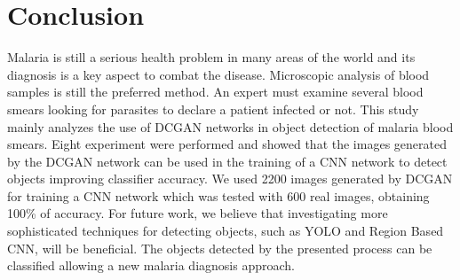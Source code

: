 \section{Conclusion}

Malaria is still a serious health problem in many areas of the world and its diagnosis is a key aspect to combat the disease. Microscopic analysis of blood samples is still the preferred method. An expert must examine several blood smears looking for parasites to declare a patient infected or not. 
This study mainly analyzes the use of DCGAN networks in object detection of malaria blood smears. Eight experiment were performed and showed that the images generated by the DCGAN network can be used in the training of a CNN network to detect objects improving classifier accuracy. We used 2200 images generated by DCGAN for training a CNN network which was tested with 600 real images, obtaining 100\% of accuracy.  
For future work, we believe that investigating more sophisticated techniques for detecting objects, such as YOLO and Region Based CNN, will be beneficial. The objects detected by the presented process can be classified allowing a new malaria diagnosis approach.